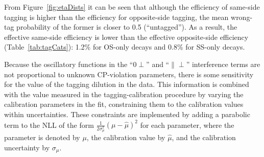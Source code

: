 From Figure~\ref{fig:etaDists} it can be seen that although the efficiency of same-side tagging is higher than the efficiency for
opposite-side tagging, the mean wrong-tag probability of the former is closer to 0.5 (``untagged''). As a result, the effective same-side
efficiency is lower than the effective opposite-side efficiency (Table~\ref{tab:tagCats}): 1.2\% for OS-only decays and 0.8\% for SS-only
decays.

Because the oscillatory functions in the ``0$\perp$'' and ``$\parallel\perp$'' interference terms are not proportional to unknown
CP-violation parameters, there is some sensitivity for the value of the tagging dilution in the \BstoJpsiKK{} data. This information is
combined with the value measured in the tagging-calibration procedure by varying the calibration parameters in the fit, constraining them
to the calibration values within uncertainties. These constraints are implemented by adding a parabolic term to the NLL of the form
$\frac{1}{2\sigma_\mu^2}(\mu-\hat{\mu})^2$ for each parameter, where the parameter is denoted by $\mu$, the calibration value by
$\hat{\mu}$, and the calibration uncertainty by $\sigma_\mu$.

